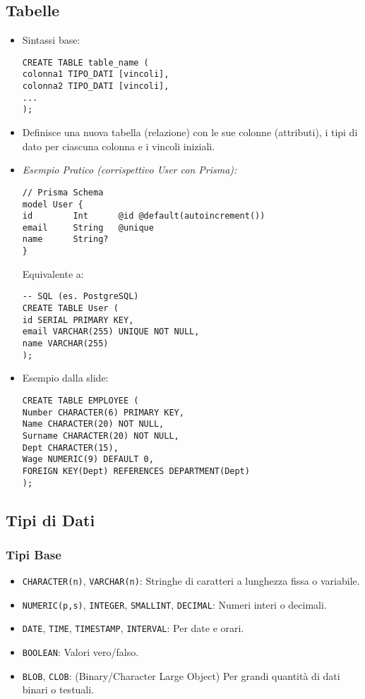 \subsection{Tabelle}
\begin{itemize}
	\item Sintassi base:
	\begin{verbatim}
CREATE TABLE table_name (
colonna1 TIPO_DATI [vincoli],
colonna2 TIPO_DATI [vincoli],
...
);
	\end{verbatim}
	\item Definisce una nuova tabella (relazione) con le sue colonne (attributi), i tipi di dato per ciascuna colonna e i vincoli iniziali.
	\item \textit{Esempio Pratico (corrispettivo User con Prisma):}
	\begin{verbatim}
// Prisma Schema
model User {
id        Int      @id @default(autoincrement())
email     String   @unique
name      String?
}
	\end{verbatim}
	Equivalente a:
	\begin{verbatim}
-- SQL (es. PostgreSQL)
CREATE TABLE User (
id SERIAL PRIMARY KEY,
email VARCHAR(255) UNIQUE NOT NULL,
name VARCHAR(255)
);
	\end{verbatim}
	\item Esempio dalla slide:
	\begin{verbatim}
CREATE TABLE EMPLOYEE (
Number CHARACTER(6) PRIMARY KEY,
Name CHARACTER(20) NOT NULL,
Surname CHARACTER(20) NOT NULL,
Dept CHARACTER(15),
Wage NUMERIC(9) DEFAULT 0,
FOREIGN KEY(Dept) REFERENCES DEPARTMENT(Dept)
);
	\end{verbatim}
\end{itemize}

\subsection{Tipi di Dati}
\subsubsection{Tipi Base}
\begin{itemize}
	\item \texttt{CHARACTER(n)}, \texttt{VARCHAR(n)}: Stringhe di caratteri a lunghezza fissa o variabile.
	\item \texttt{NUMERIC(p,s)}, \texttt{INTEGER}, \texttt{SMALLINT}, \texttt{DECIMAL}: Numeri interi o decimali.
	\item \texttt{DATE}, \texttt{TIME}, \texttt{TIMESTAMP}, \texttt{INTERVAL}: Per date e orari.
	\item \texttt{BOOLEAN}: Valori vero/falso.
	\item \texttt{BLOB}, \texttt{CLOB}: (Binary/Character Large Object) Per grandi quantità di dati binari o testuali.
\end{itemize}
